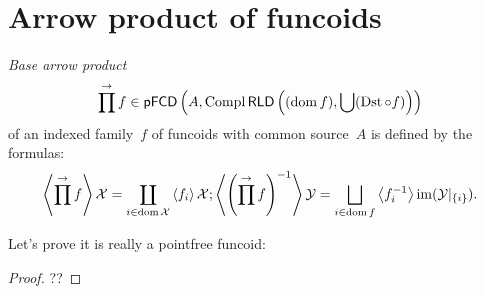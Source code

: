 \section{Arrow product of funcoids}

\begin{defn}
\emph{Base arrow product} \[ \prod^{\rightarrow}f\in\mathsf{pFCD}\left(A,\operatorname{Compl}\mathsf{RLD}\left((\operatorname{dom} f),\bigcup(\operatorname{Dst}\circ f)\right)\right) \] of an indexed family~$f$ of funcoids with common source~$A$ is defined by the formulas:
\[
\supfun{\prod^{\rightarrow} f}\mathcal{X} = \coprod_{i\in\dom\mathcal{X}}\supfun{f_i}\mathcal{X};
\supfun{\left(\prod^{\rightarrow} f\right)^{-1}}\mathcal{Y} = \bigsqcup_{i\in\dom f}\supfun{f_i^{-1}}\im(\mathcal{Y}|_{\{i\}}).
\]
\end{defn}

Let's prove it is really a pointfree funcoid:

\begin{proof}
??
\end{proof}